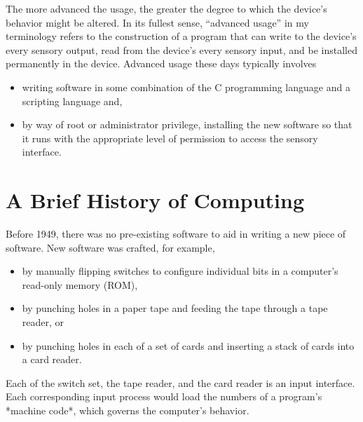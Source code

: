 \documentclass[twocolumn]{book}
\begin{document}
The more advanced the usage, the greater the degree to which the device's
behavior might be altered.  In its fullest sense, ``advanced usage'' in my
terminology refers to the construction of a program that can write to the
device's every sensory output, read from the device's every sensory input, and
be installed permanently in the device.  Advanced usage these days typically
involves
\begin{itemize}
   \item writing software in some combination of the C programming language and
      a scripting language and,
   \item by way of root or administrator privilege, installing the new software
      so that it runs with the appropriate level of permission to access the
      sensory interface.
\end{itemize}

\section{A Brief History of Computing}

Before 1949, there was no pre-existing software to aid in writing a new piece
of software.  New software was crafted, for example,
\begin{itemize}
   \item by manually flipping switches to configure individual bits in a
      computer's read-only memory (ROM),
   \item by punching holes in a paper tape and feeding the tape through a tape
      reader, or
   \item by punching holes in each of a set of cards and inserting a stack of
      cards into a card reader.
\end{itemize}
Each of the switch set, the tape reader, and the card reader is an input
interface.  Each corresponding input process would load the numbers of a
program's *machine code*, which governs the computer's behavior.
\end{document}
